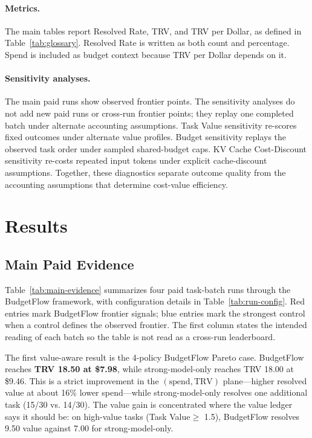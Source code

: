 \documentclass{article}
\newcommand{\method}{BudgetFlow\xspace}
\newcommand{\trv}{TRV\xspace}
\newcommand{\taskvalue}{Task Value\xspace}
\begin{document}
\paragraph{Metrics.}
The main tables report Resolved Rate, \trv, and \trv per Dollar, as defined in Table~\ref{tab:glossary}. Resolved Rate is written as both count and percentage. Spend is included as budget context because \trv per Dollar depends on it.

\paragraph{Sensitivity analyses.}
The main paid runs show observed frontier points. The sensitivity analyses do not add new paid runs or cross-run frontier points; they replay one completed batch under alternate accounting assumptions. Task Value sensitivity re-scores fixed outcomes under alternate value profiles. Budget sensitivity replays the observed task order under sampled shared-budget caps. KV Cache Cost-Discount sensitivity re-costs repeated input tokens under explicit cache-discount assumptions. Together, these diagnostics separate outcome quality from the accounting assumptions that determine cost-value efficiency.

\section{Results}
\label{sec:results}
\subsection{Main Paid Evidence}
Table~\ref{tab:main-evidence} summarizes four paid task-batch runs through the \method framework, with configuration details in Table~\ref{tab:run-config}. Red entries mark BudgetFlow frontier signals; blue entries mark the strongest control when a control defines the observed frontier. The first column states the intended reading of each batch so the table is not read as a cross-run leaderboard.

The first value-aware result is the 4-policy BudgetFlow Pareto case. \method reaches \textbf{\trv 18.50 at \$7.98}, while strong-model-only reaches \trv 18.00 at \$9.46. This is a strict improvement in the $(\mathrm{spend}, \mathrm{\trv})$ plane---higher resolved value at about 16\% lower spend---while strong-model-only resolves one additional task (15/30 vs. 14/30). The value gain is concentrated where the value ledger says it should be: on high-value tasks (\taskvalue $\geq$ 1.5), \method resolves 9.50 value against 7.00 for strong-model-only.
\end{document}
